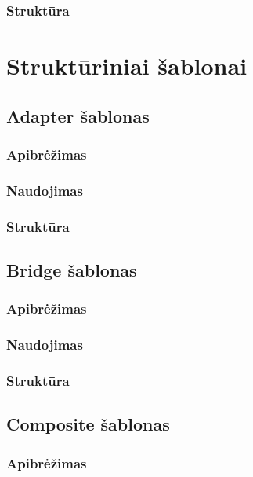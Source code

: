 \documentclass[10pt]{IEEEtran}
\begin{document}
			\subsubsection{Struktūra}

	\section{Struktūriniai šablonai}

		\subsection{Adapter šablonas}

			\subsubsection{Apibrėžimas}

			\subsubsection{Naudojimas}

			\subsubsection{Struktūra}

		\subsection{Bridge šablonas}

			\subsubsection{Apibrėžimas}

			\subsubsection{Naudojimas}

			\subsubsection{Struktūra}

		\subsection{Composite šablonas}

			\subsubsection{Apibrėžimas}
\end{document}

